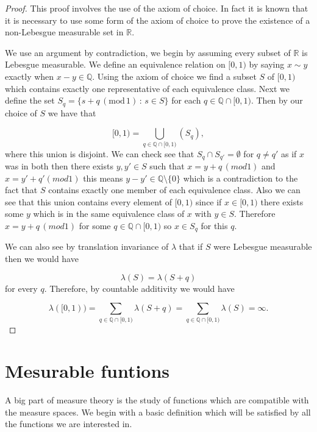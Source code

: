 \documentclass[
]{book}
\theoremstyle{definition}
\theoremstyle{definition}
\theoremstyle{definition}
\theoremstyle{definition}
\theoremstyle{remark}
\begin{document}
\begin{proof}
This proof involves the use of the axiom of choice. In fact it is known that it is necessary to use some form of the axiom of choice to prove the existence of a non-Lebesgue measurable set in \(\mathbb{R}\).

We use an argument by contradiction, we begin by assuming every subset of \(\mathbb{R}\) is Lebesgue measurable. We define an equivalence relation on \([0,1)\) by saying \(x \sim y\) exactly when \(x-y \in \mathbb{Q}\). Using the axiom of choice we find a subset \(S\) of \([0,1)\) which contains exactly one representative of each equivalence class. Next we define the set \(S_q = \{ s+q \, (\mbox{mod}\,1) \, : \, s \in S \}\) for each \(q \in \mathbb{Q} \cap [0,1)\). Then by our choice of \(S\) we have that

\[ [0,1) = \bigcup_{q \in \mathbb{Q} \cap [0,1)} (S_q), \]
where this union is disjoint. We can check see that \(S_q \cap S_{q'} = \emptyset\) for \(q \neq q'\) as if \(x\) was in both then there exists \(y, y' \in S\) such that \(x = y +q \,(mod 1)\) and \(x= y' + q' (mod 1)\) this means \(y - y' \in \mathbb{Q}\setminus\{0\}\) which is a contradiction to the fact that \(S\) contains exactly one member of each equivalence class. Also we can see that this union contains every element of \([0,1)\) since if \(x \in [0,1)\) there exists some \(y\) which is in the same equivalence class of \(x\) with \(y \in S\). Therefore \(x = y + q \,(mod 1)\) for some \(q \in \mathbb{Q}\cap [0,1)\) so \(x \in S_q\) for this \(q\).

We can also see by translation invariance of \(\lambda\) that if \(S\) were Lebesgue measurable then we would have

\[ \lambda(S) = \lambda(S+q) \]
for every \(q\). Therefore, by countable additivity we would have

\[ \lambda([0,1)) = \sum_{q \in \mathbb{Q} \cap [0,1)} \lambda (S+q) = \sum_{q \in \mathbb{Q} \cap [0,1)} \lambda(S) = \infty. \]
\end{proof}

\hypertarget{mesurable-funtions}{%
\chapter{Mesurable funtions}\label{mesurable-funtions}}

A big part of measure theory is the study of functions which are compatible with the measure spaces. We begin with a basic definition which will be satisfied by all the functions we are interested in.
\end{document}
